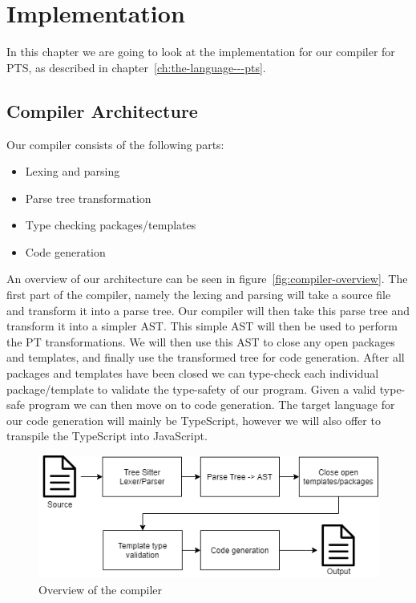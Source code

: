 
\chapter{Implementation}\label{ch:implementation}

In this chapter we are going to look at the implementation for our compiler for PTS, as described in chapter~\vref{ch:the-language---pts}.

\section{Compiler Architecture}\label{sec:architecture}

Our compiler consists of the following parts:

\begin{itemize}
    \item Lexing and parsing
    \item Parse tree transformation
    \item Type checking packages/templates
    \item Code generation
\end{itemize}

An overview of our architecture can be seen in figure~\vref{fig:compiler-overview}.
The first part of the compiler, namely the lexing and parsing will take a source file and transform it into a parse tree.
Our compiler will then take this parse tree and transform it into a simpler AST\@.
This simple AST will then be used to perform the PT transformations.
We will then use this AST to close any open packages and templates, and finally use the transformed tree for code generation.
After all packages and templates have been closed we can type-check each individual package/template to validate the type-safety of our program.
Given a valid type-safe program we can then move on to code generation.
The target language for our code generation will mainly be TypeScript, however we will also offer to transpile the TypeScript into JavaScript.

\begin{figure}
   \centering
   \includegraphics[scale=.75]{images/Compiler overview.png}
   \caption{Overview of the compiler}
   \label{fig:compiler-overview}
\end{figure}


